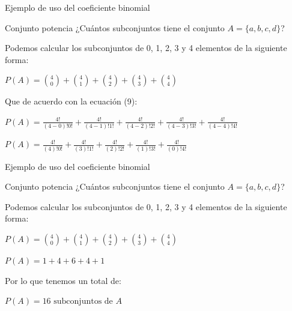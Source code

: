 \documentclass{beamer}
\begin{document}
\begin{frame}{Ejemplo de uso del coeficiente binomial}
  \begin{exampleblock}{Conjunto potencia}
    ¿Cuántos subconjuntos tiene el conjunto $A =\{a,b,c,d\}$?
  \end{exampleblock}
  Podemos calcular los subconjuntos de 0, 1, 2, 3 y 4 elementos de la siguiente
  forma:
  \begin{exampleblock}{}
    \centering
    $ P(A) = \binom{4}{0} + \binom{4}{1} + \binom{4}{2} + \binom{4}{3} + \binom{4}{4} $
  \end{exampleblock}
  Que de acuerdo con la ecuación (9): %

  \begin{exampleblock}{}
    \centering
  $ P(A) = \frac{4!}{(4-0)!0!} + \frac{4!}{(4-1)!1!} + \frac{4!}{(4-2)!2!} + \frac{4!}{(4-3)!3!} + \frac{4!}{(4-4)!4!} $
  \end{exampleblock}
  \begin{exampleblock}{}
    \centering
  $ P(A) = \frac{4!}{(4)!0!} + \frac{4!}{(3)!1!} + \frac{4!}{(2)!2!} + \frac{4!}{(1)!3!} + \frac{4!}{(0)!4!} $
  \end{exampleblock}

\end{frame}

\begin{frame}{Ejemplo de uso del coeficiente binomial}

  \begin{exampleblock}{Conjunto potencia}
    ¿Cuántos subconjuntos tiene el conjunto $A =\{a,b,c,d\}$?
  \end{exampleblock}
  
  Podemos calcular los subconjuntos de 0, 1, 2, 3 y 4 elementos de la siguiente
  forma:

  \begin{exampleblock}{}
    \centering
    $ P(A) = \binom{4}{0} + \binom{4}{1} + \binom{4}{2} + \binom{4}{3} + \binom{4}{4} $
  \end{exampleblock}
  \begin{exampleblock}{}
    \centering
    $ P(A) = 1 + 4 + 6 + 4 + 1 $
  \end{exampleblock}
  Por lo que tenemos un total de:
  \begin{exampleblock}{}
    \centering
    $ P(A) = 16 \text{ subconjuntos de } A$
  \end{exampleblock}

\end{frame}
\end{document}

